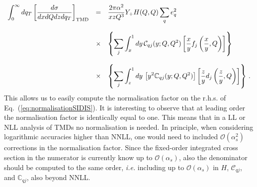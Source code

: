 \documentclass[10pt,a4paper]{article}
\begin{document}
\begin{equation}
\begin{array}{rcl}
\displaystyle \int_{0}^{\infty}dq_T\left[\frac{d\sigma}{dxdQdz d q_T}\right]_{\rm
  TMD}&=&\displaystyle \frac{2\pi \alpha^2}{xzQ^3}Y_+ H(Q,Q) \sum_q e_q^2\\
\\
&\times&\displaystyle\left\{\sum_{j}\int_x^1dy\,\mathcal{C}_{qj}(y;Q,Q^2)\left[\frac{x}{y}f_j\left(\frac{x}{y},Q\right)\right]\right\}\\
\\
&\times&\displaystyle\left\{\sum_{j}\int_z^1dy\,\left[y^2\mathbb{C}_{qj}(y;Q,Q^2)\right]\left[\frac{z}{y}d_j\left(\frac{z}{y},Q\right)\right]\right\}\,.
\end{array}
\end{equation}
This allows us to easily compute the normalisation factor on the
r.h.s. of Eq.~(\ref{eq:normalisationSIDIS}). It is interesting to
observe that at leading order the normalisation factor is identically
equal to one. This means that in a LL or NLL analysis of TMDs no
normalisation is needed. In principle, when considering logarithmic
accuracies higher than NNLL, one would need to included
$\mathcal{O}(\alpha_s^2)$ corrections in the normalisation
factor. Since the fixed-order integrated cross section in the
numerator is currently know up to $\mathcal{O}(\alpha_s)$, also the
denominator should be computed to the same order, \textit{i.e.}
including up to $\mathcal{O}(\alpha_s)$ in $H$, $\mathcal{C}_{qj}$,
and $\mathbb{C}_{qj}$, also beyond NNLL.
\end{document}
